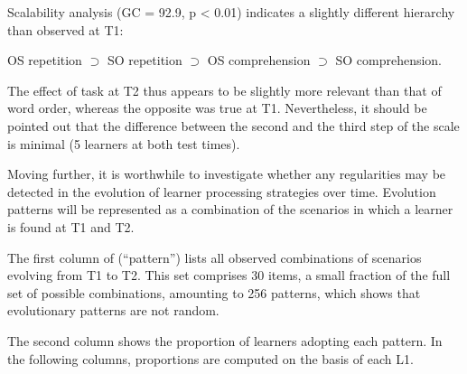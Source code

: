 Scalability analysis (GC = 92.9, p < 0.01) indicates a slightly different hierarchy than observed at T1:

OS repetition ${\supset}$ SO repetition ${\supset}$ OS comprehension ${\supset}$ SO comprehension. 

The effect of task at T2 thus appears to be slightly more relevant than that of word order, whereas the opposite was true at T1. Nevertheless, it should be pointed out that the difference between the second and the third step of the scale is minimal (5 learners at both test times).

Moving further, it is worthwhile to investigate whether any regularities may be detected in the evolution of learner processing strategies over time. Evolution patterns will be represented as a combination of the scenarios in which a learner is found at T1 and T2. 

The first column of  (“pattern”) lists all observed combinations of scenarios evolving from T1 to T2. This set comprises 30 items, a small fraction of the full set of possible combinations, amounting to 256 patterns, which shows that evolutionary patterns are not random.

The second column shows the proportion of learners adopting each pattern. In the following columns, proportions are computed on the basis of each L1.

